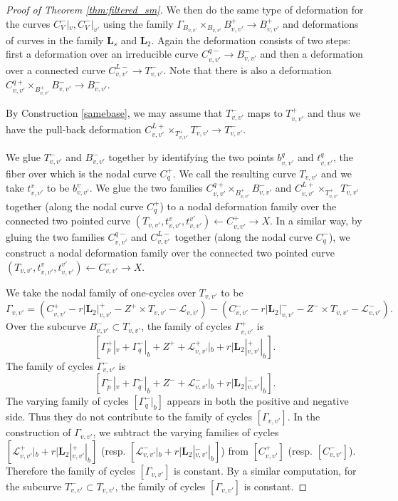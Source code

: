 \documentclass{amsart}
\theoremstyle{definition}
\theoremstyle{remark}
\begin{document}
\begin{proof}[Proof of Theorem \ref{thm:filtered_sm}]
     

     We then do the same type of deformation for the curves $C_V^-|_v, C_V^-|_{v'}$ using the family $\Gamma_{B_{v, v'}}\times_{B_{v, v'}} B^+_{v, v'}\to B^+_{v, v'}$ and deformations of curves in the family $\mathbf{L}_s$ and $\mathbf{L}_2$.
     Again the deformation consists of two steps: first a deformation over an irreducible curve $C^{q-}_{v, v'}\to B^-_{v, v'}$ and then a deformation over a connected curve $C^{L-}_{v, v'}\to T^-_{v, v'}$.
     Note that there is also a deformation $C^{q+}_{v, v'}\times_{B^+_{v, v'}}B^-_{v, v'} \to B^-_{v, v'}$.

     By Construction \ref{samebase}, we may assume that  $T_{v, v'}^-$ maps to $T^+_{v, v'}$ and thus we have the pull-back deformation $C_{v, v'}^{L+}\times_{T_{v, v'}^+} T_{v, v'}^- \to T_{v, v'}^-$. 

     We glue $T_{v, v'}^-$ and $B_{v, v'}^-$ together by identifying the two points $b_{v, v'}^q$ and $t_{v, v'}^q$, the fiber over which is the nodal curve $C_q^+$.
     We call the resulting curve $T_{v, v'}$
     and we take $t_{v, v'}^v$ to be $b_{v, v'}^v$.
     We glue the two families $C^{q+}_{v, v'}\times_{B^+_{v, v'}}B^-_{v, v'}$ and $C_{v, v'}^{L+}\times_{T_{v, v'}^+} T_{v, v'}^-$ together (along the nodal curve $C^+_q$) to a nodal deformation family over the connected two pointed curve $(T_{v, v'}, t_{v, v'}^{v}, t_{v, v'}^{v'})\leftarrow C^{+}_{v, v'} \to X$.
     In a similar way, by gluing the two families $C^{q-}_{v, v'}$ and $C_{v, v'}^{L-}$ together (along the nodal curve $C^-_q$), we construct a nodal deformation family over the connected two pointed curve $(T_{v, v'}, t_{v, v'}^{v}, t_{v, v'}^{v'})\leftarrow C_{v, v'}^- \to X$.
     

     We take the nodal family of one-cycles over $T_{v, v'}$ to be
    \[
    \Gamma_{v, v'}=(C_{v, v'}^+-r|\mathbf{L}_2|_{v, v'}^+-Z^+ \times T_{v, v'}-\mathcal{L}_{v, v'})-(C_{v, v'}^--r|\mathbf{L}_2|_{v, v'}^--Z^- \times T_{v, v'}-\mathcal{L}_{v, v'}^-).
    \] 
    Over the subcurve $B^{-}_{v, v'}\subset T_{v, v'}$, the family of cycles $\Gamma_{v, v'}^+$ is
    \[
    [\Gamma_p^+|_v+\Gamma_q^-|_b+Z^++\mathcal{L}_{v, v'}^+|_b+r|\mathbf{L}_2|_{v, v'}^+|_b].
    \]
    The family of cycles $\Gamma_{v, v'}^-$ is
    \[
    [\Gamma_p^-|_v+\Gamma_q^-|_b+Z^-+\mathcal{L}_{v, v'}^-|_b+r|\mathbf{L}_2|_{v, v'}^-|_b].
    \]
    The varying family of cycles $[\Gamma_q^-|_b]$ appears in both the positive and negative side. 
    Thus they do not contribute to the family of cycles $[\Gamma_{v, v'}]$.
    In the construction of $\Gamma_{v, v'}$, we subtract the varying families of cycles $[\mathcal{L}_{v, v'}^+|_b+r|\mathbf{L}_2|_{v, v'}^+|_b]$ (resp. $[\mathcal{L}_{v, v'}^-|_b+r|\mathbf{L}_2|_{v, v'}^-|_b]$) from $[C_{v, v'}^+]$ (resp. $[C^-_{v, v'}]$). 
    Therefore the family of cycles $[\Gamma_{v, v'}]$ is constant.
    By a similar computation, for the subcurve $T_{v, v'}^-\subset T_{v, v'}$,
    the family of cycles $[\Gamma_{v, v'}]$ is constant.


\end{proof}
\end{document}
